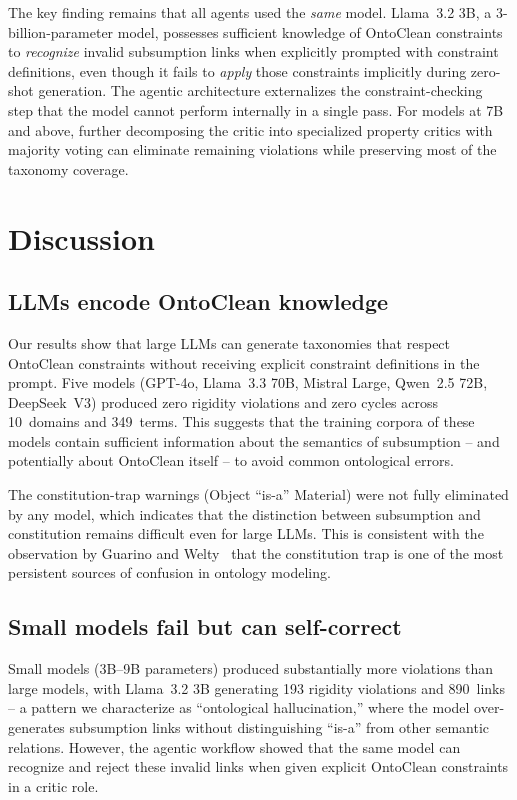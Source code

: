 \documentclass{IOS-Book-Article}
\begin{document}
The key finding remains that all agents used the \emph{same} model.
Llama~3.2 3B, a 3-billion-parameter model, possesses sufficient
knowledge of OntoClean constraints to \emph{recognize} invalid
subsumption links when explicitly prompted with constraint definitions,
even though it fails to \emph{apply} those constraints implicitly
during zero-shot generation.  The agentic architecture externalizes
the constraint-checking step that the model cannot perform internally
in a single pass.  For models at 7B and above, further decomposing
the critic into specialized property critics with majority voting
can eliminate remaining violations while preserving most of the
taxonomy coverage.

\section{Discussion}

\subsection{LLMs encode OntoClean knowledge}

Our results show that large LLMs can generate taxonomies that
respect OntoClean constraints without receiving explicit constraint
definitions in the prompt.  Five models (GPT-4o, Llama~3.3 70B,
Mistral Large, Qwen~2.5 72B, DeepSeek~V3) produced zero rigidity
violations and zero cycles across 10~domains and 349~terms.  This
suggests that the training corpora of these models contain sufficient
information about the semantics of subsumption -- and potentially
about OntoClean itself -- to avoid common ontological errors.

The constitution-trap warnings (Object ``is-a'' Material) were not
fully eliminated by any model, which indicates that the distinction
between subsumption and constitution remains difficult even for large
LLMs.  This is consistent with the observation by Guarino and
Welty~\cite{guarino2000formal} that the
constitution trap is one of the most persistent sources of
confusion in ontology modeling.

\subsection{Small models fail but can self-correct}

Small models (3B--9B parameters) produced substantially more
violations than large models, with Llama~3.2 3B generating 193
rigidity violations and 890~links -- a pattern we characterize as
``ontological hallucination,'' where the model over-generates
subsumption links without distinguishing ``is-a'' from other semantic
relations.  However, the agentic workflow showed that the same model
can recognize and reject these invalid links when given explicit
OntoClean constraints in a critic role.
\end{document}
